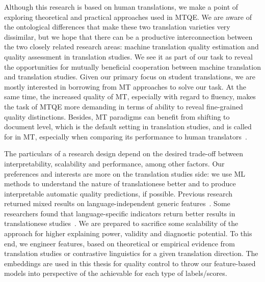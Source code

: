 Although this research is based on human translations, we make a point of exploring theoretical and practical approaches used in \gls*{MTQE}. We are aware of the ontological differences that make these two translation varieties very dissimilar, but we hope that there can be a productive interconnection between the two closely related research areas: machine translation quality estimation and quality assessment in translation studies. 
We see it as part of our task to reveal the opportunities for mutually beneficial cooperation between machine translation and translation studies. Given our primary focus on student translations, we are mostly interested in borrowing from MT approaches to solve our task. At the same time, the increased quality of MT, especially with regard to fluency, makes the task of MTQE more demanding in terms of ability to reveal fine-grained quality distinctions.
Besides, MT paradigms can benefit from shifting to document level, which is the default setting in translation studies, and is called for in MT, especially when comparing its performance to human translators~\citep{Laubli2018,Voita2019}.

The particulars of a research design depend on the desired trade-off between interpretability, scalability and performance, among other factors. Our preferences and interests are more on the translation studies side: we use ML methods to understand the nature of translationese better and to produce interpretable automatic quality predictions, if possible. Previous research returned mixed results on language-independent generic features~\citep{Sutter2017}. Some researchers found that language-specific indicators return better results in translationese studies~\citep{Hu2021}. We are prepared to sacrifice some scalability of the approach for higher explaining power, validity and diagnostic potential. To this end, we engineer features, based on theoretical or empirical evidence from translation studies or contrastive linguistics for a given translation direction. The embeddings are used in this thesis for quality control to throw our feature-based models into perspective of the achievable for each type of labels/scores. 

